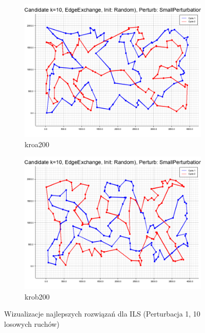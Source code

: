 \documentclass[12pt,a4paper]{article}
\begin{document}
\begin{figure}[H]
\begin{adjustwidth}{-1cm}{-1cm}
    \centering
    \begin{subfigure}[b]{0.5\textwidth}
        \centering
        \includegraphics[width=\textwidth]{figures/kroa200_ILS_Base_Local_Search_Candidate_k_10_EdgeExchange_Init_Random__Perturb_SmallPerturbation_n_moves_10_.png}
        \caption{kroa200}
    \end{subfigure}%
    \hfill
    \begin{subfigure}[b]{0.5\textwidth}
        \centering
        \includegraphics[width=\textwidth]{figures/krob200_ILS_Base_Local_Search_Candidate_k_10_EdgeExchange_Init_Random__Perturb_SmallPerturbation_n_moves_10_.png}
        \caption{krob200}
    \end{subfigure}
    \caption{Wizualizacje najlepszych rozwiązań dla ILS (Perturbacja 1, 10 losowych ruchów)}
    \label{fig:ils}
\end{adjustwidth}
\end{figure}
\end{document}
